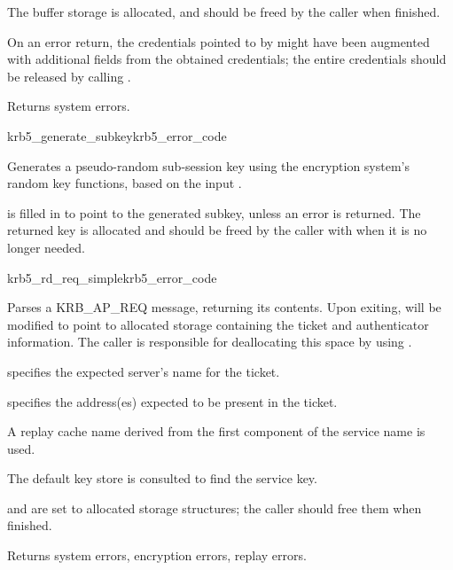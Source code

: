 The  buffer storage is allocated, and should be freed
by the caller when finished.

On an error return, the credentials pointed to by 
might have been augmented with additional fields from the obtained
credentials; the entire credentials should be released by calling
.

Returns system errors.

\begin{funcdecl}{krb5_generate_subkey}{krb5_error_code}{\funcin}
\funcout
{}
\end{funcdecl}

Generates a pseudo-random sub-session key using the encryption system's
random key functions, based on the input .

 is filled in to point to the generated subkey, unless
an error is returned.  The returned key is allocated and should be freed
by the caller with  when it is no longer
needed.

\begin{funcdecl}{krb5_rd_req_simple}{krb5_error_code}{\funcin}
\funcout
{}
\end{funcdecl}

Parses a KRB_AP_REQ message, returning its contents.  Upon exiting,
 will be modified to point to allocated storage
containing the ticket and authenticator information.  The caller is
responsible for deallocating this space by using
.

 specifies the expected server's name for the ticket.

 specifies the address(es) expected to be present
in the ticket.

A replay cache name derived from the first component of the service name
is used.

The default key store is consulted to find the service key.

 and
 are set to allocated storage
structures; the caller should free them when finished.

Returns system errors, encryption errors, replay errors.



